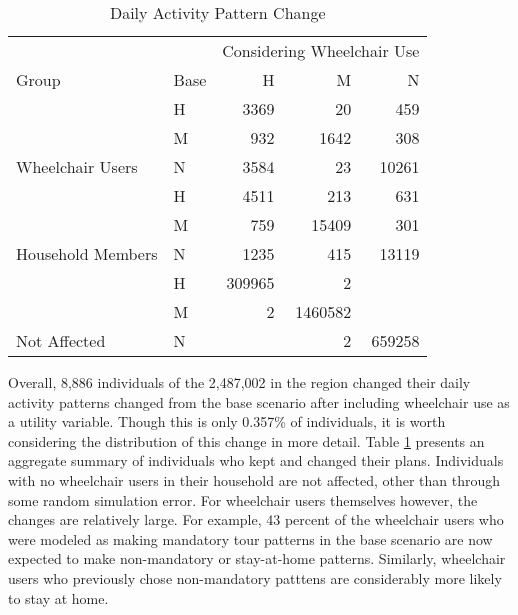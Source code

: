 \documentclass[3p, authoryear, review]{elsarticle} %
\begin{document}
\begin{table}

\caption{\label{tab:dap-summary}Daily Activity Pattern Change}
\centering
\begin{tabular}[t]{llrrr}
\toprule
\multicolumn{1}{c}{} & \multicolumn{1}{c}{} & \multicolumn{3}{c}{Considering Wheelchair Use} \\
\cmidrule(l{3pt}r{3pt}){3-5}
Group & Base & H & M & N\\
\midrule
 & H & 3369 & 20 & 459\\

 & M & 932 & 1642 & 308\\

\multirow{-3}{*}{\raggedright\arraybackslash Wheelchair Users} & N & 3584 & 23 & 10261\\
\cmidrule{1-5}
 & H & 4511 & 213 & 631\\

 & M & 759 & 15409 & 301\\

\multirow{-3}{*}{\raggedright\arraybackslash Household Members} & N & 1235 & 415 & 13119\\
\cmidrule{1-5}
 & H & 309965 & 2 & \\

 & M & 2 & 1460582 & \\

\multirow{-3}{*}{\raggedright\arraybackslash Not Affected} & N &  & 2 & 659258\\
\bottomrule
\end{tabular}
\end{table}

Overall, 8,886 individuals of the 2,487,002
in the region changed their daily activity patterns changed from the base
scenario after including wheelchair use as a utility variable.
Though this is only 0.357\% of individuals, it is worth
considering the distribution of this change in more detail. Table
\ref{tab:dap-summary} presents an aggregate summary of individuals who kept and
changed their plans. Individuals with no wheelchair users in their household are
not affected, other than through some random simulation error. For wheelchair users
themselves however, the changes are relatively large.
For example, 43 percent of the wheelchair users who were modeled as
making mandatory tour patterns in the base scenario are now expected to make
non-mandatory or stay-at-home patterns. Similarly, wheelchair users who previously
chose non-mandatory patttens are considerably more likely to stay at home.
\end{document}
